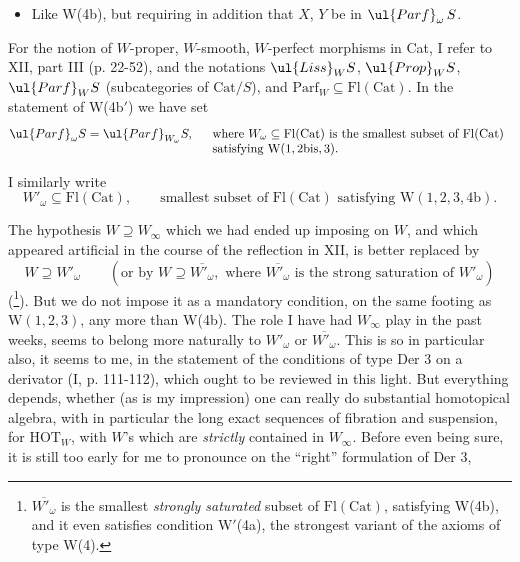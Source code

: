 \begin{itemize}[leftmargin=4em]
\item[W(4b$'$)] Like W(4b), but requiring in addition that $X$, $Y$ be in $\ul{Parf}_\omega\, S$.
\end{itemize}


For the notion of $W$-proper, $W$-smooth, $W$-perfect morphisms in Cat, I refer to XII, part III (p. 22-52), and the notations $\ul{Liss}_W S$, $\ul{Prop}_W S$, $\ul{Parf}_W S$ (subcategories of $\mathrm{Cat}/S$), and $\mathrm{Parf}_W \subseteq \mathrm{Fl}(\mathrm{Cat})$. In the statement of W(4b$'$) we have set
\[
\ul{Parf}_\omega S = \ul{Parf}_{W_\omega} S, \quad
\begin{array}[t]{l}
\text{where } W_\omega \subseteq \mathrm{Fl}(\mathrm{Cat}) \text{ is the smallest subset of } \mathrm{Fl}(\mathrm{Cat})\\
\text{satisfying } \mathrm{W}(1, 2\mathrm{bis}, 3).
\end{array}
\]

I similarly write
\[
W'_\omega \subseteq \mathrm{Fl}(\mathrm{Cat}), \qquad \text{smallest subset of } \mathrm{Fl}(\mathrm{Cat}) \text{ satisfying } \mathrm{W}(1, 2, 3, 4\mathrm{b}). %
\]


The hypothesis $W \supseteq W_\infty$ which we had ended up imposing on $W$, and which appeared artificial in the course of the reflection in XII, is better replaced by %
\[
W \supseteq W'_\omega \qquad (\text{or by } W \supseteq \overline{W'_\omega}, \text{ where } \overline{W'_\omega} \text{ is the strong saturation of } W'_\omega)
\]
(\footnote{$\overline{W'_\omega}$ is the smallest \textit{strongly saturated} subset of $\mathrm{Fl}(\mathrm{Cat})$, satisfying W(4b), and it even satisfies condition W$'$(4a), the strongest variant of the axioms of type W(4).}). But we do not impose it as a mandatory condition, on the same footing as $\mathrm{W}(1,2,3)$, any more than W(4b). The role I have had $W_\infty$ play in the past weeks, seems to belong more naturally to $W'_\omega$ or $\overline{W'_\omega}$. This is so in particular also, it seems to me, in the statement of the conditions of type Der 3 on a derivator (I, p. 111-112), which ought to be reviewed in this light. But everything depends, whether (as is my impression) one can really do substantial homotopical algebra, with in particular the long exact sequences of fibration and suspension, for $\mathrm{HOT}_W$, with $W$'s which are \textit{strictly} contained in $W_\infty$. Before even being sure, it is still too early for me to pronounce on the ``right'' formulation of Der 3,

